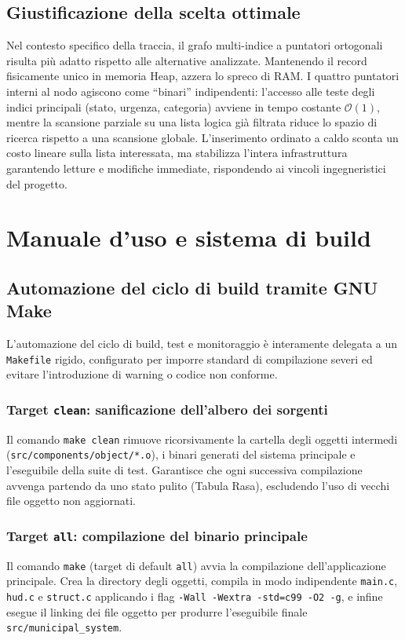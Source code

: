 \documentclass[12pt, a4paper]{article}
\begin{document}
\subsection{Giustificazione della scelta ottimale}
Nel contesto specifico della traccia, il grafo multi-indice a puntatori ortogonali risulta più adatto rispetto alle alternative analizzate. Mantenendo il record fisicamente unico in memoria Heap, azzera lo spreco di RAM. I quattro puntatori interni al nodo agiscono come ``binari'' indipendenti: l'accesso alle teste degli indici principali (stato, urgenza, categoria) avviene in tempo costante $\mathcal{O}(1)$, mentre la scansione parziale su una lista logica già filtrata riduce lo spazio di ricerca rispetto a una scansione globale. L'inserimento ordinato a caldo sconta un costo lineare sulla lista interessata, ma stabilizza l'intera infrastruttura garantendo letture e modifiche immediate, rispondendo ai vincoli ingegneristici del progetto.

\section{Manuale d'uso e sistema di build}
\label{sec:build}

\subsection{Automazione del ciclo di build tramite GNU Make}
\label{sec:makefile}
L'automazione del ciclo di build, test e monitoraggio è interamente delegata a un \texttt{Makefile} rigido, configurato per imporre standard di compilazione severi ed evitare l'introduzione di warning o codice non conforme.

\subsubsection{Target \texttt{clean}: sanificazione dell'albero dei sorgenti}
Il comando \texttt{make clean} rimuove ricorsivamente la cartella degli oggetti intermedi (\texttt{src/components/object/*.o}), i binari generati del sistema principale e l'eseguibile della suite di test. Garantisce che ogni successiva compilazione avvenga partendo da uno stato pulito (Tabula Rasa), escludendo l'uso di vecchi file oggetto non aggiornati.

\subsubsection{Target \texttt{all}: compilazione del binario principale}
Il comando \texttt{make} (target di default \texttt{all}) avvia la compilazione dell'applicazione principale. Crea la directory degli oggetti, compila in modo indipendente \texttt{main.c}, \texttt{hud.c} e \texttt{struct.c} applicando i flag \texttt{-Wall -Wextra -std=c99 -O2 -g}, e infine esegue il linking dei file oggetto per produrre l'eseguibile finale \texttt{src/municipal\_system}.
\end{document}
